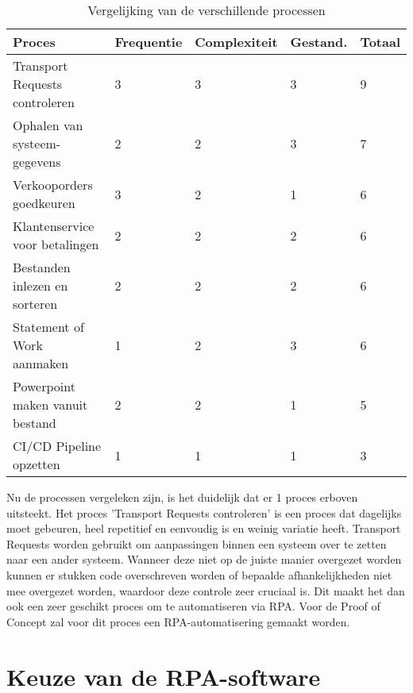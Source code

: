 \begin{table}[h]
    \centering
        \begin{tabular}{|l|l|l|l|l|}
            \hline
            Proces & Frequentie & Complexiteit & Gestand. & Totaal \\ \hline
            Transport Requests controleren & 3 & 3 & 3 & 9 \\ \hline
            Ophalen van systeem-gegevens & 2 & 2 & 3 & 7 \\ \hline
            Verkooporders goedkeuren & 3 & 2 & 1 & 6 \\ \hline
            Klantenservice voor betalingen & 2 & 2 & 2 & 6 \\ \hline
            Bestanden inlezen en sorteren & 2 & 2 & 2 & 6 \\ \hline
            Statement of Work aanmaken & 1 & 2 & 3 & 6 \\ \hline
            Powerpoint maken vanuit bestand & 2 & 2 & 1 & 5 \\ \hline
            CI/CD Pipeline opzetten & 1 & 1 & 1 & 3 \\ \hline
        \end{tabular}
    \caption{Vergelijking van de verschillende processen}
    \label{tab:processen}
\end{table}

Nu de processen vergeleken zijn, is het duidelijk dat er 1 proces erboven uitsteekt. Het proces 'Transport Requests controleren' is een proces dat dagelijks moet gebeuren, heel repetitief en eenvoudig is en weinig variatie heeft. Transport Requests worden gebruikt om aanpassingen binnen een systeem over te zetten naar een ander systeem. Wanneer deze niet op de juiste manier overgezet worden kunnen er stukken code overschreven worden of bepaalde afhankelijkheden niet mee overgezet worden, waardoor deze controle zeer cruciaal is. Dit maakt het dan ook een zeer geschikt proces om te automatiseren via RPA. Voor de Proof of Concept zal voor dit proces een RPA-automatisering gemaakt worden.

\section{Keuze van de RPA-software}
\label{sec:keuze-software}

